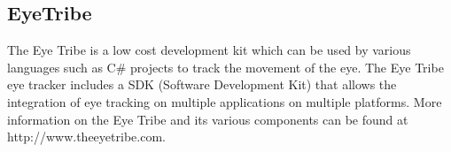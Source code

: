 \iffalse
\subsection{OGAMA}
OGAMA(OpenGazeAndMouseAnalyzer) is a free software that is used to view,capture and analyse interactive stimuli.The OGAMA.Currently OGAMA only allows for the tracking and analysis on slideshow based stimuli.OGAMA essentially uses the information gathered by the eye tracking camera to create analytics and show the user where on the slideshow the users viewed the most.OGAMA is also capable of tracking mouse movements.More information regarding OGAMA can be found at http://www.ogama.net.
\fi
\subsection{EyeTribe}
The Eye Tribe is a low cost development kit which can be used by various languages such as C\# projects to track the movement of the eye. The Eye Tribe eye tracker includes a SDK (Software Development Kit) that allows the integration of eye tracking on multiple applications on multiple platforms. More information on the Eye Tribe and its various components can be found at http://www.theeyetribe.com.
